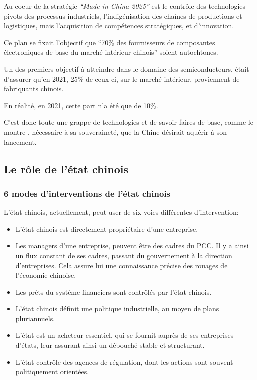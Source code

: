 \documentclass[a4paper]{article}
\begin{document}
Au coeur de la stratégie \emph{“Made in China 2025”} est le contrôle des technologies
pivots des processus industriels, l’indigénisation des chaînes de productions et
logistiques, mais l’acquisition de compétences stratégiques, et d’innovation.

Ce plan se fixait l’objectif que “70\% des fournisseurs de composantes
électroniques de base du marché intérieur chinois” soient autochtones.

Un des premiers objectif à atteindre dans le domaine des semiconducteurs, était
d’assurer qu’en 2021, 25\% de ceux ci, sur le marché intérieur, proviennent de
fabriquants chinois. \cite{Made_In_China_2025}

En réalité, en 2021, cette part n’a été que de 10\%. \cite{Futur_China_Semiconductor} 

C’est donc toute une grappe de technologies et de savoir-faires de base, comme
le montre \cite{Made_In_China_2025} , nécessaire à sa souveraineté, que la Chine
désirait aquérir à son lancement.
\subsection{Le rôle de l’état chinois}
\label{sec:org30c6878}
\subsubsection{6 modes d’interventions de l’état chinois}
\label{sec:orgecd012a}
L’état chinois, actuellement, peut user de six voies différentes d’intervention:
\begin{itemize}
\item L’état chinois est directement propriétaire d’une entreprise.
\item Les managers d’une entreprise, peuvent être des cadres du PCC. Il y a ainsi un
flux constant de ses cadres, passant du gouvernement à la direction
d’entreprises. Cela assure lui une connaissance précise des rouages de
l’économie chinoise.
\item Les prêts du système financiers sont contrôlés par l’état chinois.
\item L’état chinois définit une politique industrielle, au moyen de plans pluriannuels.
\item L’état est un acheteur essentiel, qui se fournit auprès de ses entreprises
d’états, leur assurant ainsi un débouché stable et structurant.
\item L’état contrôle des agences de régulation, dont les actions sont souvent
politiquement orientées.
\end{itemize}
\end{document}
